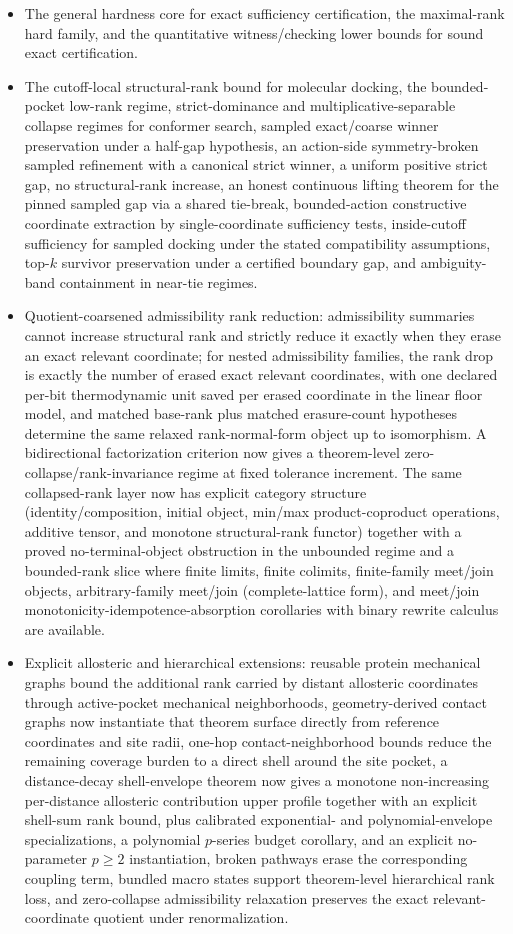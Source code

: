 \begin{itemize}
\item The general hardness core for exact sufficiency certification, the maximal-rank hard family, and the quantitative witness/checking lower bounds for sound exact certification.
\item The cutoff-local structural-rank bound for molecular docking, the bounded-pocket low-rank regime, strict-dominance and multiplicative-separable collapse regimes for conformer search, sampled exact/coarse winner preservation under a half-gap hypothesis, an action-side symmetry-broken sampled refinement with a canonical strict winner, a uniform positive strict gap, no structural-rank increase, an honest continuous lifting theorem for the pinned sampled gap via a shared tie-break, bounded-action constructive coordinate extraction by single-coordinate sufficiency tests, inside-cutoff sufficiency for sampled docking under the stated compatibility assumptions, top-$k$ survivor preservation under a certified boundary gap, and ambiguity-band containment in near-tie regimes.
\item Quotient-coarsened admissibility rank reduction: admissibility summaries cannot increase structural rank and strictly reduce it exactly when they erase an exact relevant coordinate; for nested admissibility families, the rank drop is exactly the number of erased exact relevant coordinates, with one declared per-bit thermodynamic unit saved per erased coordinate in the linear floor model, and matched base-rank plus matched erasure-count hypotheses determine the same relaxed rank-normal-form object up to isomorphism. A bidirectional factorization criterion now gives a theorem-level zero-collapse/rank-invariance regime at fixed tolerance increment. The same collapsed-rank layer now has explicit category structure (identity/composition, initial object, min/max product-coproduct operations, additive tensor, and monotone structural-rank functor) together with a proved no-terminal-object obstruction in the unbounded regime and a bounded-rank slice where finite limits, finite colimits, finite-family meet/join objects, arbitrary-family meet/join (complete-lattice form), and meet/join monotonicity-idempotence-absorption corollaries with binary rewrite calculus are available.
\item Explicit allosteric and hierarchical extensions: reusable protein mechanical graphs bound the additional rank carried by distant allosteric coordinates through active-pocket mechanical neighborhoods, geometry-derived contact graphs now instantiate that theorem surface directly from reference coordinates and site radii, one-hop contact-neighborhood bounds reduce the remaining coverage burden to a direct shell around the site pocket, a distance-decay shell-envelope theorem now gives a monotone non-increasing per-distance allosteric contribution upper profile together with an explicit shell-sum rank bound, plus calibrated exponential- and polynomial-envelope specializations, a polynomial $p$-series budget corollary, and an explicit no-parameter $p\ge 2$ instantiation, broken pathways erase the corresponding coupling term, bundled macro states support theorem-level hierarchical rank loss, and zero-collapse admissibility relaxation preserves the exact relevant-coordinate quotient under renormalization.

\end{itemize}
